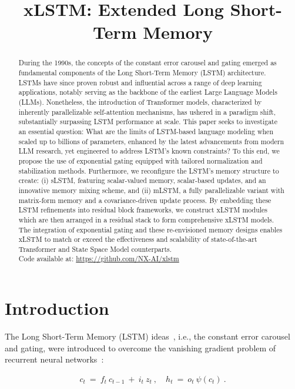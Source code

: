 \title{xLSTM: Extended Long Short-Term Memory}

\begin{abstract}
During the 1990s, the concepts of the constant error carousel and gating emerged as fundamental components of the Long Short-Term Memory (LSTM) architecture. LSTMs have since proven robust and influential across a range of deep learning applications, notably serving as the backbone of the earliest Large Language Models (LLMs). Nonetheless, the introduction of Transformer models, characterized by inherently parallelizable self-attention mechanisms, has ushered in a paradigm shift, substantially surpassing LSTM performance at scale. This paper seeks to investigate an essential question: What are the limits of LSTM-based language modeling when scaled up to billions of parameters, enhanced by the latest advancements from modern LLM research, yet engineered to address LSTM's known constraints? To this end, we propose the use of exponential gating equipped with tailored normalization and stabilization methods. Furthermore, we reconfigure the LSTM's memory structure to create: (i) sLSTM, featuring scalar-valued memory, scalar-based updates, and an innovative memory mixing scheme, and (ii) mLSTM, a fully parallelizable variant with matrix-form memory and a covariance-driven update process. By embedding these LSTM refinements into residual block frameworks, we construct xLSTM modules which are then arranged in a residual stack to form comprehensive xLSTM models. The integration of exponential gating and these re-envisioned memory designs enables xLSTM to match or exceed the effectiveness and scalability of state-of-the-art Transformer and State Space Model counterparts.\\
Code available at: \url{https://github.com/NX-AI/xlstm}
\end{abstract}

\section{Introduction}
\label{sec:intro}

The Long Short-Term Memory (LSTM) ideas~\citep{Hochreiter:91,Hochreiter:97nips,Hochreiter:97}, i.e., the constant error carousel and gating, were introduced to overcome the vanishing gradient problem of recurrent neural networks~\citep{Hochreiter:91,Hochreiter:00book}:

\begin{align}
\label{eq:lstm_idea}
  c_t \ = \ f_t \ c_{t-1} \ + \ 
          i_t \  z_t \ , \quad  
          h_t \ = \ o_t \ \psi({c_t}) \ . 
\end{align}

